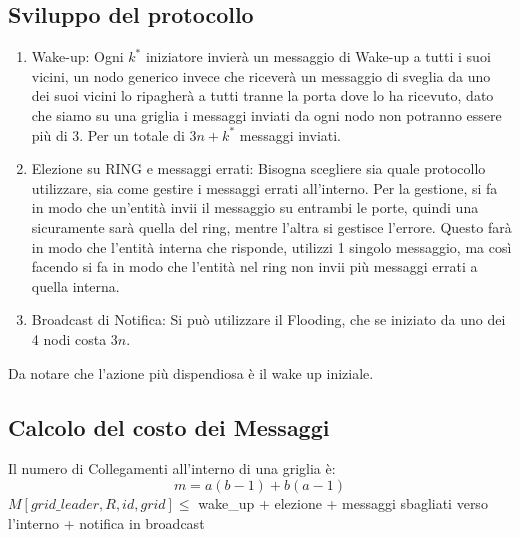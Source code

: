 \subsection{Sviluppo del protocollo}
\begin{enumerate}
    \item Wake-up: Ogni $k^*$ iniziatore invierà un messaggio di Wake-up a tutti i
          suoi vicini, un nodo generico invece che riceverà un messaggio di sveglia da
          uno dei suoi vicini lo ripagherà a tutti tranne la porta dove lo ha ricevuto,
          dato che siamo su una griglia i messaggi inviati da ogni nodo non potranno
          essere più di 3. Per un totale di $3n +k^*$ messaggi inviati.
    \item Elezione su RING e messaggi errati: Bisogna scegliere sia quale
          protocollo utilizzare, sia come gestire i messaggi errati all'interno. Per la
          gestione, si fa in modo che un'entità invii il messaggio su entrambi le porte,
          quindi una sicuramente sarà quella del ring, mentre l'altra si gestisce
          l'errore. Questo farà in modo che l'entità interna che risponde, utilizzi 1
          singolo messaggio, ma così facendo si fa in modo che l'entità nel ring non
          invii più messaggi errati a quella interna.
    \item Broadcast di Notifica: Si può utilizzare il Flooding, che se iniziato da
          uno dei 4 nodi costa $3n$.
\end{enumerate}
Da notare che l'azione più dispendiosa è il wake up iniziale.

\subsection{Calcolo del costo dei Messaggi}
Il numero di Collegamenti all'interno di una griglia è:
$$m=a(b-1)+b(a-1)$$ $M[grid\_leader,R,id,grid] \leq $ wake\_up + elezione +
messaggi sbagliati verso l'interno + notifica in broadcast\\

